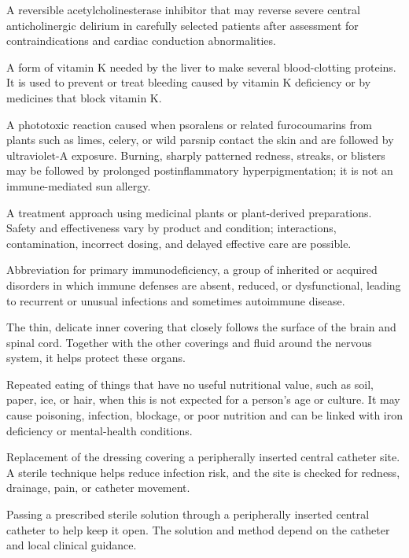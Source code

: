 A reversible acetylcholinesterase inhibitor that may reverse severe central anticholinergic delirium in carefully selected patients after assessment for contraindications and cardiac conduction abnormalities.

 A form of vitamin K needed by the liver to make several blood-clotting proteins. It is used to prevent or treat bleeding caused by vitamin K deficiency or by medicines that block vitamin K.

 A phototoxic reaction caused when psoralens or related furocoumarins from plants such as limes, celery, or wild parsnip contact the skin and are followed by ultraviolet-A exposure. Burning, sharply patterned redness, streaks, or blisters may be followed by prolonged postinflammatory hyperpigmentation; it is not an immune-mediated sun allergy.

 A treatment approach using medicinal plants or plant-derived preparations. Safety and effectiveness vary by product and condition; interactions, contamination, incorrect dosing, and delayed effective care are possible.

 Abbreviation for primary immunodeficiency, a group of inherited or acquired disorders in which immune defenses are absent, reduced, or dysfunctional, leading to recurrent or unusual infections and sometimes autoimmune disease.

 The thin, delicate inner covering that closely follows the surface of the brain and spinal cord. Together with the other coverings and fluid around the nervous system, it helps protect these organs.

 Repeated eating of things that have no useful nutritional value, such as soil, paper, ice, or hair, when this is not expected for a person's age or culture. It may cause poisoning, infection, blockage, or poor nutrition and can be linked with iron deficiency or mental-health conditions.

 Replacement of the dressing covering a peripherally inserted central catheter site. A sterile technique helps reduce infection risk, and the site is checked for redness, drainage, pain, or catheter movement.


 Passing a prescribed sterile solution through a peripherally inserted central catheter to help keep it open. The solution and method depend on the catheter and local clinical guidance.


